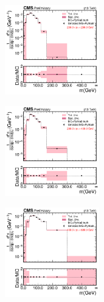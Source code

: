       \begin{figure}[htp!]
	\centering
	\begin{subfigure}
          \centering
          \includegraphics[width=0.45\textwidth]{figures/multijet/unfolding/trijet/closure_binnedResult_ungroomed_0.pdf}
        \end{subfigure}%
        \begin{subfigure}
          \centering
          \includegraphics[width=0.45\textwidth]{figures/multijet/unfolding/trijet/closure_binnedResult_ungroomed_1.pdf}
        \end{subfigure}%
        \begin{subfigure}
          \centering
          \includegraphics[width=0.45\textwidth]{figures/multijet/unfolding/trijet/closure_binnedResult_ungroomed_2.pdf}
        \end{subfigure}%
        \begin{subfigure}

\end{subfigure}
\end{figure}
